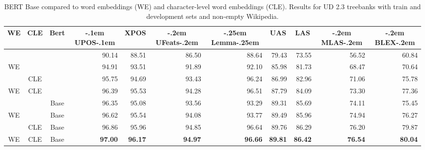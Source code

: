 \documentclass[11pt,a4paper]{article}
\begin{document}
\begin{table*}[t]
  \begin{center}
\begin{tabular}{c|c|c||r|r|r|r|r|r|r|r}
\multicolumn{1}{c|}{WE} & \multicolumn{1}{c|}{CLE} & \multicolumn{1}{c||}{Bert} & \multicolumn{1}{c|}{\kern-.1em UPOS\kern-.1em} & \multicolumn{1}{c|}{XPOS} & \multicolumn{1}{c|}{\kern-.2em UFeats\kern-.2em} & \multicolumn{1}{c|}{\kern-.25em Lemma\kern-.25em} & \multicolumn{1}{c|}{UAS} & \multicolumn{1}{c|}{LAS} & \multicolumn{1}{c|}{\kern-.2em MLAS\kern-.2em} & \multicolumn{1}{c}{\kern-.2em BLEX\kern-.2em}\\\hline\hline
 &  &  & 90.14 & 88.51 & 86.50 & 88.64 & 79.43 & 73.55 & 56.52 & 60.84\\\hline
WE &  &  & 94.91 & 93.51 & 91.89 & 92.10 & 85.98 & 81.73 & 68.47 & 70.64\\\hline
 & CLE &  & 95.75 & 94.69 & 93.43 & 96.24 & 86.99 & 82.96 & 71.06 & 75.78\\\hline
WE & CLE &  & 96.39 & 95.53 & 94.28 & 96.51 & 87.79 & 84.09 & 73.30 & 77.36\\\hline
 &  & Base & 96.35 & 95.08 & 93.56 & 93.29 & 89.31 & 85.69 & 74.11 & 75.45\\\hline
WE &  & Base & 96.62 & 95.54 & 94.08 & 93.77 & 89.49 & 85.96 & 74.94 & 76.27\\\hline
 & CLE & Base & 96.86 & 95.96 & 94.85 & 96.64 & 89.76 & 86.29 & 76.20 & 79.87\\\hline
WE & CLE & Base & \bf 97.00 & \bf 96.17 & \bf 94.97 & \bf 96.66 & \bf 89.81 & \bf 86.42 & \bf 76.54 & \bf 80.04\\\hline
\end{tabular}
   \end{center}
  \caption{BERT Base compared to word embeddings (WE) and character-level word
  embeddings (CLE). Results for  UD 2.3 treebanks with train and development sets
  and non-empty Wikipedia.}
  \label{table:bert}
\end{table*}
\end{document}
